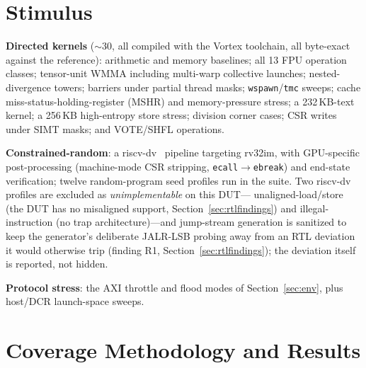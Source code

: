\documentclass[conference]{IEEEtran}
\newcommand{\code}[1]{\texttt{\small #1}}
\begin{document}
\section{Stimulus}
\label{sec:stimulus}

\textbf{Directed kernels} (${\sim}30$, all compiled with the Vortex
toolchain, all byte-exact against the reference): arithmetic and
memory baselines; all 13 FPU operation classes; tensor-unit WMMA
including multi-warp collective launches; nested-divergence towers;
barriers under partial thread masks; \code{wspawn}/\code{tmc} sweeps;
cache miss-status-holding-register (MSHR) and memory-pressure stress;
a 232\,KB-text kernel; a 256\,KB
high-entropy store stress; division corner cases; CSR writes under
SIMT masks; and VOTE/SHFL operations.

\textbf{Constrained-random}: a riscv-dv~\cite{riscvdv} pipeline
targeting rv32im, with GPU-specific post-processing (machine-mode CSR
stripping, \code{ecall}$\to$\code{ebreak}) and end-state verification;
twelve random-program seed profiles run in the suite. Two riscv-dv
profiles are excluded as \emph{unimplementable} on this DUT---%
unaligned-load/store (the DUT has no misaligned support,
Section~\ref{sec:rtlfindings}) and illegal-instruction (no trap
architecture)---and jump-stream generation is sanitized to keep the
generator's deliberate JALR-LSB probing away from an RTL deviation it
would otherwise trip (finding R1, Section~\ref{sec:rtlfindings}); the
deviation itself is reported, not hidden.

\textbf{Protocol stress}: the AXI throttle and flood modes of
Section~\ref{sec:env}, plus host/DCR launch-space sweeps.

\section{Coverage Methodology and Results}
\label{sec:coverage}
\end{document}
